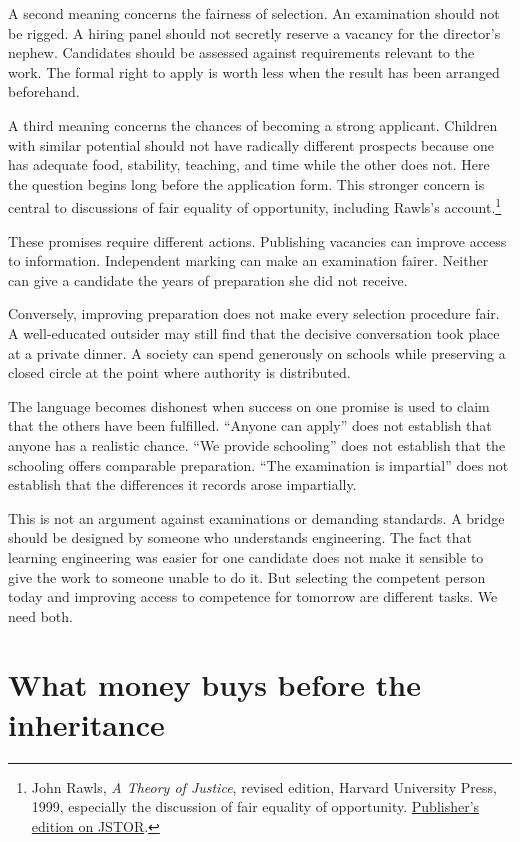 \documentclass[12pt,a4paper]{book}
\begin{document}
A second meaning concerns the fairness of selection. An examination should not be rigged. A hiring panel should not secretly reserve a vacancy for the director's nephew. Candidates should be assessed against requirements relevant to the work. The formal right to apply is worth less when the result has been arranged beforehand.

A third meaning concerns the chances of becoming a strong applicant. Children with similar potential should not have radically different prospects because one has adequate food, stability, teaching, and time while the other does not. Here the question begins long before the application form. This stronger concern is central to discussions of fair equality of opportunity, including Rawls's account.\footnote{John Rawls, \emph{A Theory of Justice}, revised edition, Harvard University Press, 1999, especially the discussion of fair equality of opportunity. \href{https://www.jstor.org/stable/j.ctvkjb25m}{Publisher's edition on JSTOR}.}

These promises require different actions. Publishing vacancies can improve access to information. Independent marking can make an examination fairer. Neither can give a candidate the years of preparation she did not receive.

Conversely, improving preparation does not make every selection procedure fair. A well-educated outsider may still find that the decisive conversation took place at a private dinner. A society can spend generously on schools while preserving a closed circle at the point where authority is distributed.

The language becomes dishonest when success on one promise is used to claim that the others have been fulfilled. ``Anyone can apply'' does not establish that anyone has a realistic chance. ``We provide schooling'' does not establish that the schooling offers comparable preparation. ``The examination is impartial'' does not establish that the differences it records arose impartially.

This is not an argument against examinations or demanding standards. A bridge should be designed by someone who understands engineering. The fact that learning engineering was easier for one candidate does not make it sensible to give the work to someone unable to do it. But selecting the competent person today and improving access to competence for tomorrow are different tasks. We need both.

\section*{What money buys before the inheritance}
\end{document}
